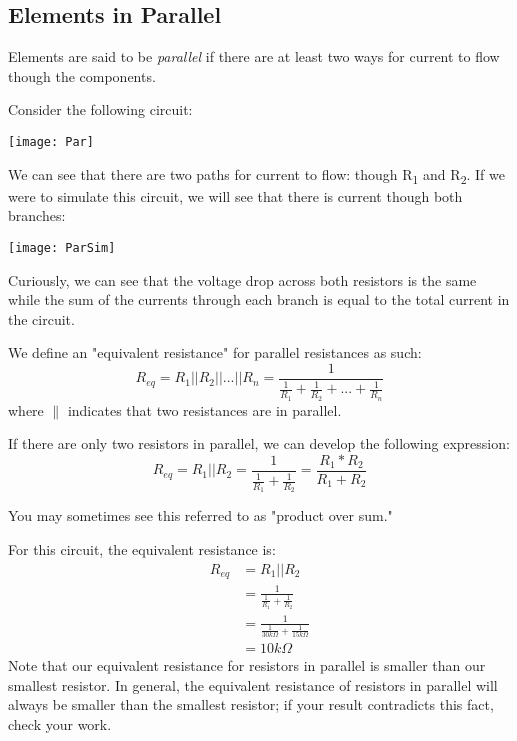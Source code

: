 \documentclass[12pt,letterpaper]{article}
\begin{document}
\subsection{Elements in Parallel}
Elements are said to be \textit{parallel} if there are at least two ways for current to flow though the components. 

Consider the following circuit:
\begin{center}
\texttt{[image: Par]}
\end{center}

We can see that there are two paths for current to flow: though R\textsubscript{1} and R\textsubscript{2}. If we were to simulate this circuit, we will see that there is current though both branches:

\begin{center}
\texttt{[image: ParSim]}
\end{center}

Curiously, we can see that the voltage drop across both resistors is the same while the sum of the currents through each branch is equal to the total current in the circuit. \par

We define an "equivalent resistance" for parallel resistances as such:
\begin{equation} R_{eq} = R_{1} || R_{2} || ... || R_{n} = \frac{1}{ \frac{1}{R_1} + \frac{1}{R_2} + ... + \frac{1}{R_n}} \end{equation}
where $\parallel$ indicates that two resistances are in parallel. 

If there are only two resistors in parallel, we can develop the following expression:
\begin{equation} 
 R_{eq} = R_{1} || R_{2} = \frac{1}{ \frac{1}{R_1} + \frac{1}{R_2}} = \frac{R_{1}*R_{2}}{R_{1}+R_{2}} 
\end{equation}

You may sometimes see this referred to as "product over sum."

For this circuit, the equivalent resistance is:
\begin{equation}
\begin{split}
 R_{eq} &= R_{1} || R_{2} \\
&=  \frac{1}{ \frac{1}{R_1} + \frac{1}{R_2}} \\
&=  \frac{1}{ \frac{1}{30k\Omega} + \frac{1}{15k\Omega}} \\
&= 10k\Omega
\end{split}
\end{equation}
Note that our equivalent resistance for resistors in parallel is smaller than our smallest resistor. In general, the equivalent resistance of resistors in parallel will always be smaller than the smallest resistor; if your result contradicts this fact, check your work. 
\end{document}
